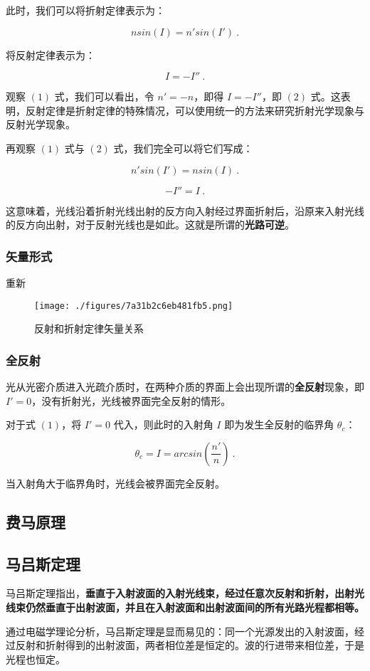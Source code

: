 此时，我们可以将折射定律表示为：

\begin{equation}
nsin(I)=n'sin(I') ~.
\end{equation}

将反射定律表示为：

\begin{equation}
I=-I'' ~.
\end{equation}

观察 $(1)$ 式，我们可以看出，令 $n'=-n$，即得 $I=-I''$，即 $(2)$ 式。这表明，反射定律是折射定律的特殊情况，可以使用统一的方法来研究折射光学现象与反射光学现象。

再观察 $(1)$ 式与 $(2)$ 式，我们完全可以将它们写成：

\begin{equation}
n'sin(I')=nsin(I) ~.
\end{equation}

\begin{equation}
-I''=I ~.
\end{equation}

这意味着，光线沿着折射光线出射的反方向入射经过界面折射后，沿原来入射光线的反方向出射，对于反射光线也是如此。这就是所谓的\textbf{光路可逆}。

\subsubsection{矢量形式}

重新

\begin{figure}[ht]
\centering
\texttt{[image: ./figures/7a31b2c6eb481fb5.png]}
\caption{反射和折射定律矢量关系} \label{fig_GeOp2_2}
\end{figure}

\subsubsection{全反射}

光从光密介质进入光疏介质时，在两种介质的界面上会出现所谓的\textbf{全反射}现象，即 $I'=0$，没有折射光，光线被界面完全反射的情形。

对于式 $(1)$，将 $I'=0$ 代入，则此时的入射角 $I$ 即为发生全反射的临界角 $\theta_c$：

\begin{equation}
\theta _c=I=arcsin(\frac{n'}{n}) ~.
\end{equation}

当入射角大于临界角时，光线会被界面完全反射。

\subsection{费马原理}

\subsection{马吕斯定理}

马吕斯定理指出，\textbf{垂直于入射波面的入射光线束，经过任意次反射和折射，出射光线束仍然垂直于出射波面，并且在入射波面和出射波面间的所有光路光程都相等。}

通过电磁学理论分析，马吕斯定理是显而易见的：同一个光源发出的入射波面，经过反射和折射得到的出射波面，两者相位差是恒定的。波的行进带来相位差，于是光程也恒定。
